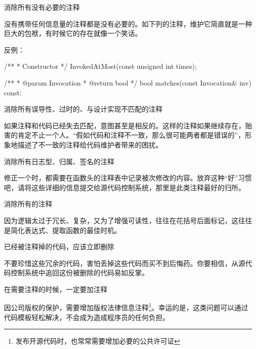 \begin{content}
\begin{regulation}
消除所有没有必要的注释
\end{regulation}

没有携带任何信息量的注释都是没有必要的。如下列的注释，维护它简直就是一种巨大的包袱，有时候它的存在就像一个笑话。

反例：
\begin{leftbar}
\begin{c++}
/**
 * Constructor
 */
InvokedAtMost(const unsigned int times);

/**
 * @param Invocation
 * @return bool
 */
bool matches(const Invocation& inv) const;
\end{c++}
\end{leftbar}

\begin{regulation}
消除所有误导性、过时的、与设计实现不匹配的注释
\end{regulation}

如果注释和代码已经失去匹配，意图甚至是相反的。这样的注释如果继续存在，贻害的肯定不止一个人。“假如代码和注释不一致，那么很可能两者都是错误的”，形象地描述了不一致的注释给代码维护者带来的困扰。

\begin{regulation}
消除所有日志型、归属、签名的注释
\end{regulation}

修正一个时，都需要在函数头的注释表中记录被次修改的内容。放弃这种“好”习惯吧，请将这些详细的信息提交给源代码控制系统，那里是此类注释最好的归所。

\begin{regulation}
消除所有的注释
\end{regulation}

因为逻辑太过于冗长、复杂，又为了增强可读性，往往在花括号后面标记，这往往是简化表达式、提取函数的最佳时机。

\begin{regulation}
已经被注释掉的代码，应该立即删除
\end{regulation}

不要珍惜这些冗余的代码，害怕丢掉这些代码而买不到后悔药。你要相信，从源代码控制系统中追回这份被删除的代码易如反掌。

\begin{regulation}
在需要注释的时候，一定要加注释
\end{regulation}

因公司版权的保护，需要增加版权法律信息注释\footnote{发布开源代码时，也常常需要增加必要的公共许可证}。幸运的是，这类问题可以通过代码模板轻松解决，不会成为造成程序员的任何负担。


\end{content}
